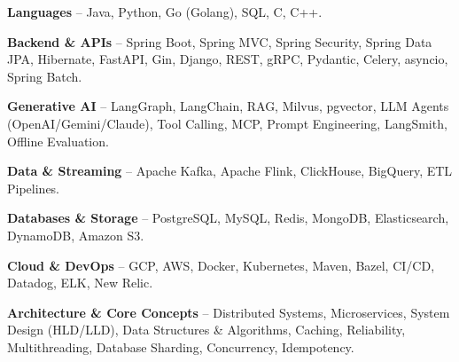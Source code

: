 \begin{zitemize}
\item \textbf{Languages} -- Java, Python, Go (Golang), SQL, C, C++.
\item \textbf{Backend \& APIs} -- Spring Boot, Spring MVC, Spring Security, Spring Data JPA, Hibernate, FastAPI, Gin, Django, REST, gRPC, Pydantic, Celery, asyncio, Spring Batch.
\item \textbf{Generative AI} -- LangGraph, LangChain, RAG, Milvus, pgvector, LLM Agents (OpenAI/Gemini/Claude), Tool Calling, MCP, Prompt Engineering, LangSmith, Offline Evaluation.
\item \textbf{Data \& Streaming} -- Apache Kafka, Apache Flink, ClickHouse, BigQuery, ETL Pipelines.
\item \textbf{Databases \& Storage} -- PostgreSQL, MySQL, Redis, MongoDB, Elasticsearch, DynamoDB, Amazon S3.
\item \textbf{Cloud \& DevOps} -- GCP, AWS, Docker, Kubernetes, Maven, Bazel, CI/CD, Datadog, ELK, New Relic.
\item \textbf{Architecture \& Core Concepts} -- Distributed Systems, Microservices, System Design (HLD/LLD), Data Structures \& Algorithms, Caching, Reliability, Multithreading, Database Sharding, Concurrency, Idempotency.
\end{zitemize}
